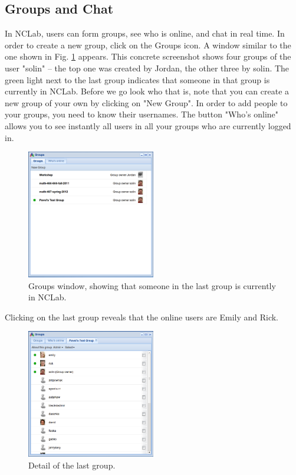 \documentclass{article}
\begin{document}
\subsection{Groups and Chat}

In NCLab, users can form groups, see who is online, and chat in real time. In order to 
create a new group, click on the Groups icon. A window similar to the one shown 
in Fig. \ref{fig:groups} appears. This concrete screenshot shows four groups of the 
user "solin" -- the top one was created by Jordan, the other three by solin. The 
green light next to the last group indicates that someone in that group
is currently in NCLab. Before we go look who that is, note that you can create a
new group of your own by clicking on "New Group". In order to add people to your groups,
you need to know their usernames. The button "Who's online" allows you to see instantly 
all users in all your groups who are currently logged in. 

\begin{figure}[!ht]
\begin{center}
\includegraphics[width=0.5\textwidth]{img/groups.png}
\end{center}
\caption{Groups window, showing that someone in the last group is currently in NCLab.}
\label{fig:groups}
\end{figure}

\newpage
\noindent
Clicking on the last group 
reveals that the online users are Emily and Rick.
\begin{figure}[!ht]
\begin{center}
\includegraphics[width=0.5\textwidth]{img/groups-2.png}
\end{center}
\caption{Detail of the last group.}
\label{fig:groups-2}
\end{figure}
\end{document}
